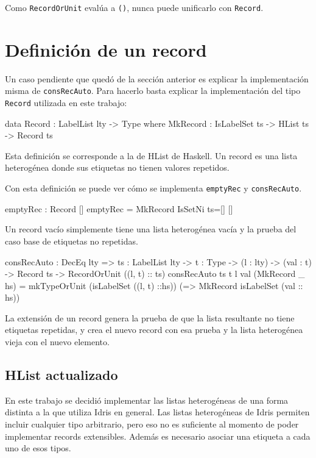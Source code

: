 Como \texttt{RecordOrUnit} evalúa a \texttt{()}, nunca puede unificarlo con \texttt{Record}.

\section{Definición de un record}

Un caso pendiente que quedó de la sección anterior es explicar la implementación misma de \texttt{consRecAuto}. Para hacerlo basta explicar la implementación del tipo \texttt{Record} utilizada en este trabajo:

\begin{code}
data Record : LabelList lty -> Type where
  MkRecord : IsLabelSet ts -> HList ts -> Record ts
\end{code}

Esta definición se corresponde a la de HList de Haskell. Un record es una lista heterogénea donde sus etiquetas no tienen valores repetidos.

Con esta definición se puede ver cómo se implementa \texttt{emptyRec} y \texttt{consRecAuto}.

\begin{code}
emptyRec : Record []
emptyRec = MkRecord IsSetNi {ts=[]} []
\end{code}

Un record vacío simplemente tiene una lista heterogénea vacía y la prueba del caso base de etiquetas no repetidas.

\begin{code}
consRecAuto : DecEq lty => {ts : LabelList lty} ->
  {t : Type} -> (l : lty) -> (val : t) -> Record ts ->
  RecordOrUnit ((l, t) :: ts)
consRecAuto {ts} {t} l val (MkRecord _ hs) =
  mkTypeOrUnit (isLabelSet ((l, t) ::hs))
  (\isLabelSet => MkRecord isLabelSet (val :: hs))
\end{code}

La extensión de un record genera la prueba de que la lista resultante no tiene etiquetas repetidas, y crea el nuevo record con esa prueba y la lista heterogénea vieja con el nuevo elemento.

\subsection{HList actualizado}

En este trabajo se decidió implementar las listas heterogéneas de una forma distinta a la que utiliza Idris en general. Las listas heterogéneas de Idris permiten incluir cualquier tipo arbitrario, pero eso no es suficiente al momento de poder implementar records extensibles. Además es necesario asociar una etiqueta a cada uno de esos tipos.

